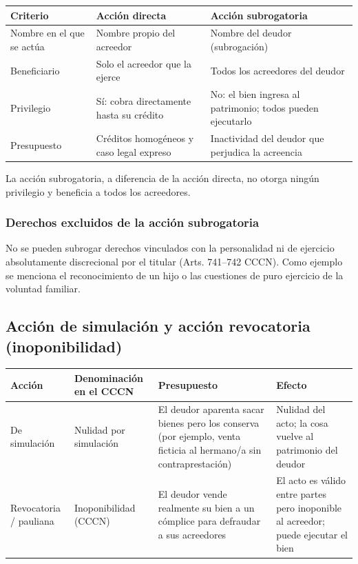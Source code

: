 \documentclass[12pt,oneside]{book}
\newenvironment{tabla}{%
    \par\medskip\begingroup\small\renewcommand{\arraystretch}{1.3}\noindent\ignorespaces
}{%
    \par\endgroup\medskip
}
\begin{document}
\begin{tabla}
\begin{tabularx}{\textwidth}{B{3.4cm}YY}
\toprule
Criterio & \textbf{Acción directa} & \textbf{Acción subrogatoria} \\
\midrule
Nombre en el que se actúa & Nombre propio del acreedor & Nombre del deudor (subrogación) \\
Beneficiario & Solo el acreedor que la ejerce & Todos los acreedores del deudor \\
Privilegio & Sí: cobra directamente hasta su crédito & No: el bien ingresa al patrimonio; todos pueden ejecutarlo \\
Presupuesto & Créditos homogéneos y caso legal expreso & Inactividad del deudor que perjudica la acreencia \\
\bottomrule
\end{tabularx}
\end{tabla}

\begin{important}
La acción subrogatoria, a diferencia de la acción directa, no otorga ningún privilegio y beneficia a todos los acreedores.
\end{important}

\subsubsection{Derechos excluidos de la acción subrogatoria}

No se pueden subrogar derechos vinculados con la personalidad ni de ejercicio absolutamente discrecional por el titular (Arts. 741--742 CCCN). Como ejemplo se menciona el reconocimiento de un hijo o las cuestiones de puro ejercicio de la voluntad familiar.

\subsection{Acción de simulación y acción revocatoria (inoponibilidad)}

\begin{tabla}
\begin{tabularx}{\textwidth}{B{2.6cm}P{3.2cm}YY}
\toprule
Acción & \textbf{Denominación en el CCCN} & \textbf{Presupuesto} & \textbf{Efecto} \\
\midrule
De simulación & Nulidad por simulación & El deudor aparenta sacar bienes pero los conserva (por ejemplo, venta ficticia al hermano/a sin contraprestación) & Nulidad del acto; la cosa vuelve al patrimonio del deudor \\
Revocatoria / pauliana & Inoponibilidad (CCCN) & El deudor vende realmente su bien a un cómplice para defraudar a sus acreedores & El acto es válido entre partes pero inoponible al acreedor; puede ejecutar el bien \\
\bottomrule
\end{tabularx}
\end{tabla}
\end{document}
